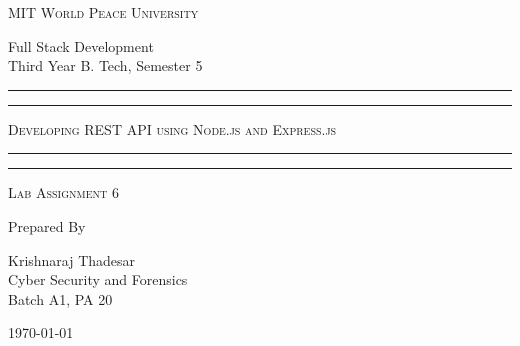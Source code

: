 \documentclass[11pt]{article}
\begin{document}
\begin{titlepage}
    \centering


    \huge\textsc{
        MIT World Peace University
    }\\

    \vspace{0.75\baselineskip} %

    \LARGE{
        Full Stack Development\\
        Third Year B. Tech, Semester 5
    }

    \vfill %


    \rule{\textwidth}{1.6pt}\vspace*{-\baselineskip}\vspace*{2pt}
    \rule{\textwidth}{0.6pt}
    \vspace{0.75\baselineskip} %



    \huge{\textsc{
            Developing REST API using Node.js and Express.js
        }} \\



    \vspace{0.5\baselineskip} %
    \rule{\textwidth}{0.6pt}\vspace*{-\baselineskip}\vspace*{2.8pt}
    \rule{\textwidth}{1.6pt}

    \vspace{1\baselineskip} %


    \LARGE\textsc{
        Lab Assignment 6
    } %
    \vfill


    Prepared By
    \vspace{0.5\baselineskip} %

    \Large{
        Krishnaraj Thadesar \\
        Cyber Security and Forensics\\
        Batch A1, PA 20
    }


    \vspace{0.5\baselineskip} %
    \today

\end{titlepage}
\end{document}
